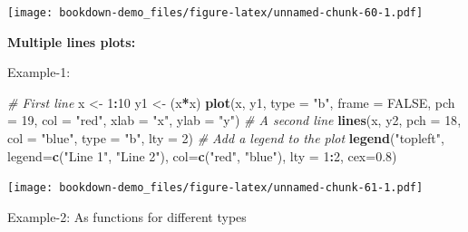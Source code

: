 \documentclass[]{book}
\newenvironment{Shaded}{\begin{snugshade}}{\end{snugshade}}
\newcommand{\KeywordTok}[1]{\textcolor[rgb]{0.13,0.29,0.53}{\textbf{#1}}}
\newcommand{\DataTypeTok}[1]{\textcolor[rgb]{0.13,0.29,0.53}{#1}}
\newcommand{\DecValTok}[1]{\textcolor[rgb]{0.00,0.00,0.81}{#1}}
\newcommand{\FloatTok}[1]{\textcolor[rgb]{0.00,0.00,0.81}{#1}}
\newcommand{\StringTok}[1]{\textcolor[rgb]{0.31,0.60,0.02}{#1}}
\newcommand{\CommentTok}[1]{\textcolor[rgb]{0.56,0.35,0.01}{\textit{#1}}}
\newcommand{\OtherTok}[1]{\textcolor[rgb]{0.56,0.35,0.01}{#1}}
\newcommand{\OperatorTok}[1]{\textcolor[rgb]{0.81,0.36,0.00}{\textbf{#1}}}
\newcommand{\NormalTok}[1]{#1}
\begin{document}
\texttt{[image: bookdown-demo\_files/figure-latex/unnamed-chunk-60-1.pdf]}

\textbf{Multiple lines plots:}

Example-1:

\begin{Shaded}
\begin{Highlighting}[]
\CommentTok{# First line}
\NormalTok{x <-}\StringTok{ }\DecValTok{1}\OperatorTok{:}\DecValTok{10}
\NormalTok{y1 <-}\StringTok{ }\NormalTok{(x}\OperatorTok{*}\NormalTok{x)}
\KeywordTok{plot}\NormalTok{(x, y1, }\DataTypeTok{type =} \StringTok{"b"}\NormalTok{, }\DataTypeTok{frame =} \OtherTok{FALSE}\NormalTok{, }\DataTypeTok{pch =} \DecValTok{19}\NormalTok{, }
     \DataTypeTok{col =} \StringTok{"red"}\NormalTok{, }\DataTypeTok{xlab =} \StringTok{"x"}\NormalTok{, }\DataTypeTok{ylab =} \StringTok{"y"}\NormalTok{)}
\CommentTok{# A second line}
\KeywordTok{lines}\NormalTok{(x, y2, }\DataTypeTok{pch =} \DecValTok{18}\NormalTok{, }\DataTypeTok{col =} \StringTok{"blue"}\NormalTok{, }\DataTypeTok{type =} \StringTok{"b"}\NormalTok{, }\DataTypeTok{lty =} \DecValTok{2}\NormalTok{)}
\CommentTok{# Add a legend to the plot}
\KeywordTok{legend}\NormalTok{(}\StringTok{"topleft"}\NormalTok{, }\DataTypeTok{legend=}\KeywordTok{c}\NormalTok{(}\StringTok{"Line 1"}\NormalTok{, }\StringTok{"Line 2"}\NormalTok{),}
       \DataTypeTok{col=}\KeywordTok{c}\NormalTok{(}\StringTok{"red"}\NormalTok{, }\StringTok{"blue"}\NormalTok{), }\DataTypeTok{lty =} \DecValTok{1}\OperatorTok{:}\DecValTok{2}\NormalTok{, }\DataTypeTok{cex=}\FloatTok{0.8}\NormalTok{)}
\end{Highlighting}
\end{Shaded}

\texttt{[image: bookdown-demo\_files/figure-latex/unnamed-chunk-61-1.pdf]}

Example-2: As functions for different types
\end{document}
